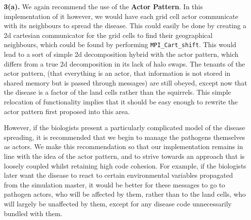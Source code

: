 \documentclass[conference]{IEEEtran}
\begin{document}
\noindent\textbf{3(a).} \newline
We again recommend the use of the \textbf{Actor Pattern}. In this implementation of it however, we would have each grid cell actor communicate with its neighbours to spread the disease. This could easily be done by creating a 2d cartesian communicator for the grid cells to find their geographical neighbours, which could be found by performing \texttt{MPI\_Cart\_shift}. This would lead to a sort of simple 2d decomposition hybrid with the actor pattern, which differs from a true 2d decomposition in its lack of halo swaps. The tenants of the actor pattern, (that everything is an actor, that information is not stored in shared memory but is passed through messages) are still obeyed, except now that the disease is a factor of the land cells rather than the squirrels. This simple relocation of functionality implies that it should be easy enough to rewrite the actor pattern first proposed into this area.

However, if the biologists present a particularly complicated model of the disease spreading, it is recommended that we begin to manage the pathogens themselves as actors. We make this recommendation so that our implementation remains in line with the idea of the actor pattern, and to strive towards an approach that is loosely coupled whilst retaining high code cohesion. For example, if the biologists later want the disease to react to certain environmental variables propagated from the simulation master, it would be better for these messages to go to pathogen actors, who will be affected by them, rather than to the land cells, who will largely be unaffected by them, except for any disease code unnecessarily bundled with them.
\end{document}

